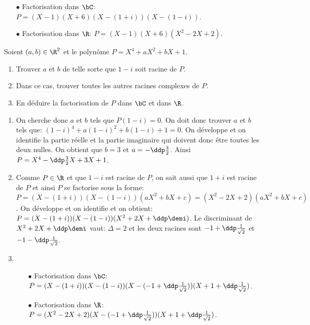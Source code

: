 \documentclass[a4paper, 11pt,reqno]{article}
\begin{document}
\begin{correction}
\begin{enumerate}
\begin{itemize}
			      \item[$\bullet$] Factorisation dans $\bC$: $P=(X-1)(X+6)(X-(1+i))(X-(1-i))$.
			      \item[$\bullet$] Factorisation dans $\R$: $P=(X-1)(X+6)(X^2-2X+2)$.
		      \end{itemize}
	\end{enumerate}
\end{correction}


\begin{exercice}
	Soient $(a,b)\in\R^2$ et le polyn\^ome $P=X^4+aX^2+bX+1$.
	\begin{enumerate}
		\item Trouver $a$ et $b$ de telle sorte que $1-i$ soit racine de $P$.
		\item Dans ce cas, trouver toutes les autres racines complexes de $P$.
		\item En d\'eduire la factorisation de $P$ dans $\bC$ et dans $\R$.
	\end{enumerate}
\end{exercice}
\begin{correction}
	\begin{enumerate}
		\item On cherche donc $a$ et $b$ tels que $P(1-i)=0$. On doit donc trouver $a$ et $b$ tels que: $(1-i)^4+a(1-i)^2+b(1-i)+1=0$. On d\'eveloppe et on identifie la partie r\'eelle et la partie imaginaire qui doivent donc \^{e}tre toutes les deux nulles. On obtient que $b=3$ et $a=-\ddp\frac{3}{2}$. Ainsi $P=X^4-\ddp\frac{3}{2}X +3X+1$.
		\item Comme $P\in\R$ et que $1-i$ est racine de $P$, on sait aussi que $1+i$ est racine de $P$ et ainsi $P$ se factorise sous la forme: $P=(X-(1+i))(X-(1-i))(aX^2+bX+c)=(X^2-2X+2)(aX^2+bX+c)$. On d\'eveloppe et on identifie et on obtient:
		      $P=(X-(1+i))(X-(1-i))( X^2+2X+\ddp\demi )$. Le discriminant de $X^2+2X+\ddp\demi$ vaut: $\Delta=2$ et les deux racines sont $-1+\ddp\frac{1}{\sqrt{2}}$ et $-1-\ddp\frac{1}{\sqrt{2}}$.
		\item
		      \begin{itemize}
			      \item[$\bullet$] Factorisation dans $\bC$: $P=(X-(1+i))(X-(1-i)) (X-(-1+\ddp\frac{1}{\sqrt{2}})) (X+1+\ddp\frac{1}{\sqrt{2}})$.
			      \item[$\bullet$] Factorisation dans $\R$: $P=(X^2-2X+2)  (X-(-1+\ddp\frac{1}{\sqrt{2}})) (X+1+\ddp\frac{1}{\sqrt{2}})$.
		      \end{itemize}
	\end{enumerate}
\end{correction}
\end{document}
